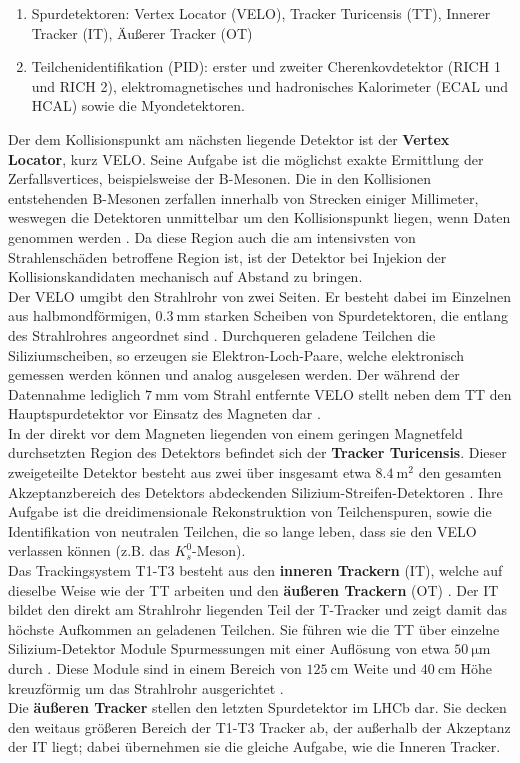 %
\begin{enumerate}
  \item Spurdetektoren: Vertex Locator (VELO), Tracker Turicensis (TT), Innerer Tracker (IT), Äußerer Tracker (OT)
  \item Teilchenidentifikation (PID): erster und zweiter Cherenkovdetektor (RICH 1 und RICH 2), elektromagnetisches und hadronisches Kalorimeter (ECAL und HCAL) sowie die Myondetektoren.
\end{enumerate}
%
Der dem Kollisionspunkt am nächsten liegende Detektor ist der \textbf{Vertex Locator}, kurz VELO. Seine Aufgabe ist die möglichst exakte Ermittlung der Zerfallsvertices, beispielsweise der B-Mesonen. Die in den Kollisionen entstehenden B-Mesonen zerfallen innerhalb von Strecken einiger Millimeter, weswegen die Detektoren unmittelbar um den Kollisionspunkt liegen, wenn Daten genommen werden \cite{velo}. Da diese Region auch die am intensivsten von Strahlenschäden betroffene Region ist, ist der Detektor bei Injekion der Kollisionskandidaten mechanisch auf Abstand zu bringen.\\
Der VELO umgibt den Strahlrohr von zwei Seiten. Er besteht dabei im Einzelnen aus halbmondförmigen, $\SI{0.3}{\milli\meter}$ starken Scheiben von Spurdetektoren, die entlang des Strahlrohres angeordnet sind \cite{velo}. Durchqueren geladene Teilchen die Siliziumscheiben, so erzeugen sie Elektron-Loch-Paare, welche elektronisch gemessen werden können und analog ausgelesen werden. Der während der Datennahme lediglich $\SI{7}{\milli\meter}$ vom Strahl entfernte VELO stellt neben dem TT den Hauptspurdetektor vor Einsatz des Magneten dar \cite{velo}. \\
%
In der direkt vor dem Magneten liegenden von einem geringen Magnetfeld durchsetzten Region des Detektors befindet sich der \textbf{Tracker Turicensis}. Dieser zweigeteilte Detektor besteht aus zwei über insgesamt etwa $\SI{8.4}{\meter\squared}$ den gesamten Akzeptanzbereich des Detektors abdeckenden Silizium-Streifen-Detektoren \cite{lhcb}. Ihre Aufgabe ist die dreidimensionale Rekonstruktion von Teilchenspuren, sowie die Identifikation von neutralen Teilchen, die so lange leben, dass sie den VELO verlassen können (z.B. das $K_s^0$-Meson).\\
%
Das Trackingsystem T1-T3 besteht aus den \textbf{inneren Trackern} (IT), welche auf dieselbe Weise wie der TT arbeiten und den \textbf{äußeren Trackern} (OT) \cite{tracker}. Der IT bildet den direkt am Strahlrohr liegenden Teil der T-Tracker und zeigt damit das höchste Aufkommen an geladenen Teilchen. Sie führen wie die TT über einzelne Silizium-Detektor Module Spurmessungen mit einer Auflösung von etwa $\SI{50}{\micro\meter}$ durch \cite{Tilburg}. Diese Module sind in einem Bereich von $\SI{125}{\centi\meter}$ Weite und $\SI{40}{\centi\meter}$ Höhe kreuzförmig um das Strahlrohr ausgerichtet \cite{tracker}.\\
Die \textbf{äußeren Tracker} stellen den letzten Spurdetektor im LHCb dar. Sie decken den weitaus größeren Bereich der T1-T3 Tracker ab, der außerhalb der Akzeptanz der IT liegt; dabei übernehmen sie die gleiche Aufgabe, wie die Inneren Tracker.\\

